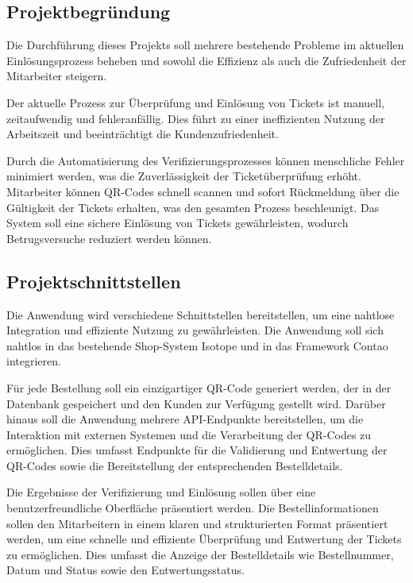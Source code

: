 \subsection{Projektbegründung} 
\label{sec:Projektbegruendung}

Die Durchführung dieses Projekts soll mehrere bestehende Probleme im aktuellen Einlösungsprozess beheben und sowohl die Effizienz als auch die Zufriedenheit der Mitarbeiter steigern.

Der aktuelle Prozess zur Überprüfung und Einlösung von Tickets ist manuell, zeitaufwendig und fehleranfällig. Dies führt zu einer ineffizienten Nutzung der Arbeitszeit und beeinträchtigt die Kundenzufriedenheit.

Durch die Automatisierung des Verifizierungsprozesses können menschliche Fehler minimiert werden, was die Zuverlässigkeit der Ticketüberprüfung erhöht. Mitarbeiter können QR-Codes schnell scannen und sofort Rückmeldung über die Gültigkeit der Tickets erhalten, was den gesamten Prozess beschleunigt. Das System soll eine sichere Einlösung von Tickets gewährleisten, wodurch Betrugsversuche reduziert werden können.

\subsection{Projektschnittstellen} 
\label{sec:Projektschnittstellen}

Die Anwendung wird verschiedene Schnittstellen bereitstellen, um eine nahtlose Integration und effiziente Nutzung zu gewährleisten. Die Anwendung soll sich nahtlos in das bestehende Shop-System Isotope und in das Framework Contao integrieren.

Für jede Bestellung soll ein einzigartiger QR-Code generiert werden, der in der Datenbank gespeichert und den Kunden zur Verfügung gestellt wird. Darüber hinaus soll die Anwendung mehrere API-Endpunkte bereitstellen, um die Interaktion mit externen Systemen und die Verarbeitung der QR-Codes zu ermöglichen. Dies umfasst Endpunkte für die Validierung und Entwertung der QR-Codes sowie die Bereitstellung der entsprechenden Bestelldetails.

Die Ergebnisse der Verifizierung und Einlösung sollen über eine benutzerfreundliche Oberfläche präsentiert werden. Die Bestellinformationen sollen den Mitarbeitern in einem klaren und strukturierten Format präsentiert werden, um eine schnelle und effiziente Überprüfung und Entwertung der Tickets zu ermöglichen. Dies umfasst die Anzeige der Bestelldetails wie Bestellnummer, Datum und Status sowie den Entwertungsstatus.

